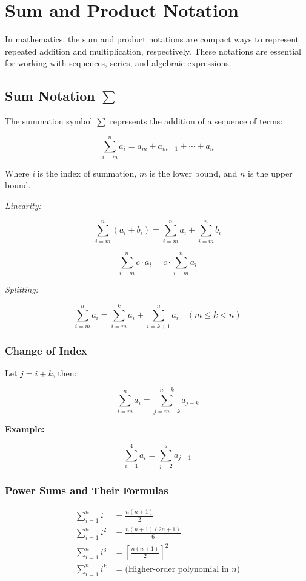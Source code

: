 \newpage
\section{Sum and Product Notation}

In mathematics, the sum and product notations are compact ways to represent repeated addition and 
multiplication, respectively. These notations are essential for working with sequences, series, and 
algebraic expressions.

\subsection{Sum Notation \texorpdfstring{\(\sum\)}{∑}}

The summation symbol \(\sum\) represents the addition of a sequence of terms:

\[
    \sum_{i = m}^{n} a_i = a_m + a_{m+1} + \cdots + a_n
\]

Where \emph{i} is the index of summation, \(m\) is the lower bound, and \(n\) is the upper bound.
\vspace{\baselineskip}

\emph{Linearity:}

\[
    \sum_{i = m}^{n} (a_i + b_i) = \sum_{i = m}^{n} a_i + \sum_{i = m}^{n} b_i
\]
    
\[
    \sum_{i = m}^{n} c \cdot a_i = c \cdot \sum_{i = m}^{n} a_i
\]

\emph{Splitting:}
    
\[
    \sum_{i = m}^{n} a_i = \sum_{i = m}^{k} a_i + \sum_{i = k+1}^{n} a_i \quad (m \le k < n)
\]

\subsubsection{Change of Index}

Let \(j = i + k\), then:

\[
    \sum_{i = m}^{n} a_i = \sum_{j = m + k}^{n + k} a_{j - k}
\]

\textbf{Example:}
\vspace{\baselineskip}

\[
    \sum_{i = 1}^{4} a_i = \sum_{j = 2}^{5} a_{j - 1}
\]

\subsubsection{Power Sums and Their Formulas}

\begin{align*}
    \sum_{i = 1}^{n} i &= \frac{n(n+1)}{2} \\
    \sum_{i = 1}^{n} i^2 &= \frac{n(n+1)(2n+1)}{6} \\
    \sum_{i = 1}^{n} i^3 &= {\left[\frac{n(n+1)}{2}\right]}^2 \\
    \sum_{i = 1}^{n} i^k &= \text{(Higher-order polynomial in \(n\))}
\end{align*}

